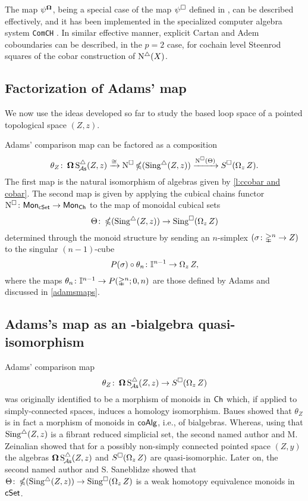 The map $\psi^{\operatorname{\mathbf{\Omega}}}$, being a special case of the map $\psi^\square$ defined in \cite{medina2020maysteenrod}, can be described effectively, and it has been implemented in the specialized computer algebra system \texttt{ComCH} \cite{medina2021computer}.
In similar effective manner, explicit Cartan and Adem coboundaries \cite{medina2020cartan, medina2020adem} can be described, in the $p = 2$ case, for cochain level Steenrod squares of the cobar construction of $\operatorname{N^{\triangle}}(X)$.

\subsection{Factorization of Adams' map} \label{ss:factorization of adams}

We now use the ideas developed so far to study the based loop space of a pointed topological space $(Z, z)$.

Adams' comparison map can be factored as a composition
\begin{equation} \label{e:factorization of adams}
\theta_Z \colon \operatorname{\mathbf{\Omega}} \operatorname{S^{\triangle}_{\!{\mathcal{A}\mathsf{s}}}}(Z, z) \xrightarrow{\cong}
\operatorname{N^{\square}} \operatorname{\mathbb{\Omega}}(\operatorname{Sing^{\triangle}}(Z, z)) \xrightarrow{\operatorname{N^{\square}}(\Theta)}
S^{\square}(\operatorname{\Omega}_z Z).
\end{equation}
The first map is the natural isomorphism of algebras given by \cref{l:ccobar and cobar}. The second map is given by applying the cubical chains functor $\operatorname{N^{\square}} \colon \mathsf{Mon}_{\mathsf{cSet}} \to \mathsf{Mon}_{\mathsf{Ch}}$ to the map of monoidal cubical sets
\[
\Theta \colon \operatorname{\mathbb{\Omega}}(\operatorname{Sing^{\triangle}}(Z, z)) \to \operatorname{Sing^{\square}}(\operatorname{\Omega}_z Z)
\]
determined through the monoid structure by sending an $n$-simplex $(\sigma \colon \mathbb{\Delta}^n \to Z)$ to the singular $(n-1)$-cube
\[
P(\sigma) \circ \theta_n \colon \mathbb{I}^{n-1} \to \operatorname{\Omega}_z Z,
\]
where the maps $\theta_n \colon \mathbb{I}^{n-1} \to P(\mathbb{\Delta}^n;0,n)$ are those defined by Adams and discussed in \cref{adamsmaps}.

\subsection{Adams's map as an \pdfEinfty-bialgebra quasi-isomorphism}

Adams' comparison map
\[
\theta_Z \colon \operatorname{\mathbf{\Omega}} \operatorname{S^{\triangle}_{\!{\mathcal{A}\mathsf{s}}}}(Z, z) \to S^{\square}(\operatorname{\Omega}_z Z)
\]
was originally identified to be a morphism of monoids in $\mathsf{Ch}$ which, if applied to simply-connected spaces, induces a homology isomorphism.
Baues showed that $\theta_Z$ is in fact a morphism of monoids in $\mathsf{coAlg}$, i.e., of bialgebras.
Whereas, using that $\operatorname{Sing^{\triangle}}(Z, z)$ is a fibrant reduced simplicial set, the second named author and M. Zeinalian \cite{rivera2018cubical} showed that for a possibly non-simply connected pointed space $(Z,y)$ the algebras $\operatorname{\mathbf{\Omega}} \operatorname{S^{\triangle}_{\!{\mathcal{A}\mathsf{s}}}}(Z, z)$ and $S^{\square}(\operatorname{\Omega}_zZ)$ are quasi-isomorphic.
Later on, the second named author and S. Saneblidze
\cite{rivera2019path} showed that $\Theta \colon \operatorname{\mathbb{\Omega}}(\operatorname{Sing^{\triangle}}(Z, z)) \to \operatorname{Sing^{\square}}(\operatorname{\Omega}_z Z)$ is a weak homotopy equivalence monoids in $\mathsf{cSet}$.

